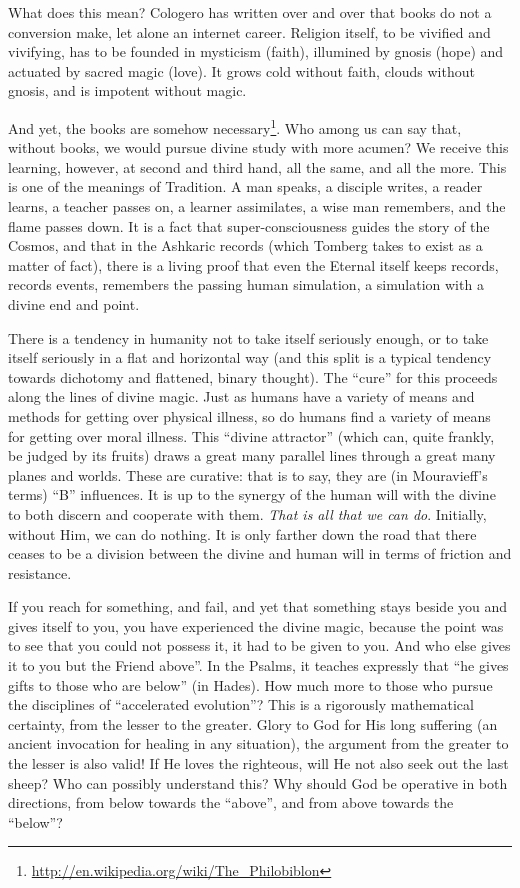 What does this mean? Cologero has written over and over that books do not a conversion make, let alone an internet career. Religion itself, to be vivified and vivifying, has to be founded in mysticism (faith), illumined by gnosis (hope) and actuated by sacred magic (love). It grows cold without faith, clouds without gnosis, and is impotent without magic.

And yet, the books are somehow necessary\footnote{\url{http://en.wikipedia.org/wiki/The\_Philobiblon}}. Who among us can say that, without books, we would pursue divine study with more acumen? We receive this learning, however, at second and third hand, all the same, and all the more. This is one of the meanings of Tradition. A man speaks, a disciple writes, a reader learns, a teacher passes on, a learner assimilates, a wise man remembers, and the flame passes down. It is a fact that super-consciousness guides the story of the Cosmos, and that in the Ashkaric records (which Tomberg takes to exist as a matter of fact), there is a living proof that even the Eternal itself keeps records, records events, remembers the passing human simulation, a simulation with a divine end and point.

There is a tendency in humanity not to take itself seriously enough, or to take itself seriously in a flat and horizontal way (and this split is a typical tendency towards dichotomy and flattened, binary thought). The ``cure'' for this proceeds along the lines of divine magic. Just as humans have a variety of means and methods for getting over physical illness, so do humans find a variety of means for getting over moral illness. This ``divine attractor'' (which can, quite frankly, be judged by its fruits) draws a great many parallel lines through a great many planes and worlds. These are curative: that is to say, they are (in Mouravieff's terms) ``B'' influences. It is up to the synergy of the human will with the divine to both discern and cooperate with them. \emph{That is all that we can do}. Initially, without Him, we can do nothing. It is only farther down the road that there ceases to be a division between the divine and human will in terms of friction and resistance.

If you reach for something, and fail, and yet that something stays beside you and gives itself to you, you have experienced the divine magic, because the point was to see that you could not possess it, it had to be given to you. And who else gives it to you but the Friend above''. In the Psalms, it teaches expressly that ``he gives gifts to those who are below'' (in Hades). How much more to those who pursue the disciplines of ``accelerated evolution''? This is a rigorously mathematical certainty, from the lesser to the greater. Glory to God for His long suffering (an ancient invocation for healing in any situation), the argument from the greater to the lesser is also valid! If He loves the righteous, will He not also seek out the last sheep? Who can possibly understand this? Why should God be operative in both directions, from below towards the ``above'', and from above towards the ``below''?


